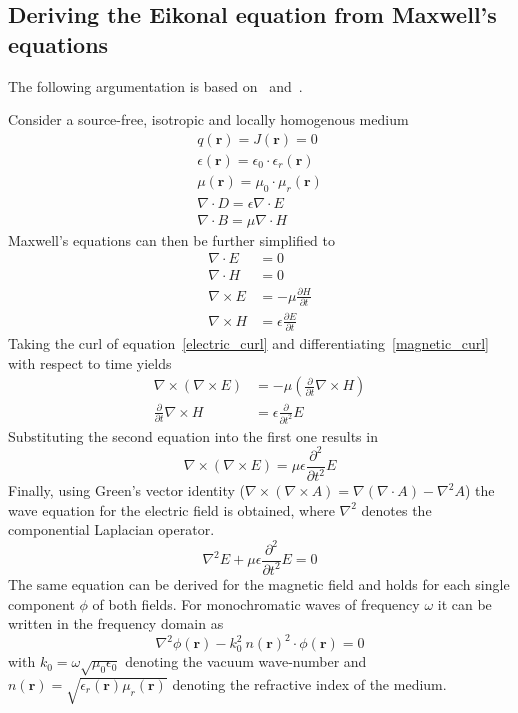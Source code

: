 \subsection{Deriving the Eikonal equation from Maxwell's equations}
The following argumentation is based on~\parencite{born_geometrische_1933} and~\parencite{sommerfeld_anwendung_1911}.

Consider a source-free, isotropic and locally homogenous medium
\begin{gather}
    q(\mathbf{r}) = J(\mathbf{r}) = 0 \\
    \epsilon(\mathbf{r}) = \epsilon_0 \cdot \epsilon_r(\mathbf{r}) \\
    \mu(\mathbf{r}) = \mu_0 \cdot \mu_r(\mathbf{r}) \\
    \nabla \cdot D = \epsilon \nabla \cdot E \\
    \nabla \cdot B = \mu \nabla \cdot H 
\end{gather}
Maxwell's equations can then be further simplified to
\begin{align}
    \nabla \cdot E &= 0 \\
    \nabla \cdot H &= 0 \\
    \nabla \times E &= -\mu \frac{\partial H}{\partial t}\label{electric_curl} \\
    \nabla \times H &= \epsilon \frac{\partial E}{\partial t}\label{magnetic_curl}
\end{align}
Taking the curl of equation~\eqref{electric_curl} and differentiating~\eqref{magnetic_curl} with respect to time yields
\begin{align}
    \nabla \times (\nabla \times E) &= -\mu (\frac{\partial}{\partial t} \nabla \times H) \\
    \frac{\partial}{\partial t} \nabla \times H &= \epsilon \frac{\partial}{\partial t^2} E
\end{align}
Substituting the second equation into the first one results in
\begin{equation}
    \nabla \times (\nabla \times E) = \mu \epsilon \frac{\partial^2}{\partial t^2} E
\end{equation}
Finally, using Green's vector identity (\(\nabla \times (\nabla \times A) = \nabla(\nabla \cdot A) - \nabla^2 A\)) the wave equation for the electric field is obtained, where \(\nabla^2\) denotes the componential Laplacian operator.
\begin{equation}
    \nabla^2 E + \mu \epsilon \frac{\partial^2}{\partial t^2} E = 0
\end{equation}
The same equation can be derived for the magnetic field and holds for each single component \(\phi \) of both fields.
For monochromatic waves of frequency \(\omega \) it can be written in the frequency domain as
\begin{equation}\label{electromagnetic_wave_equation}
    \nabla^2 \phi(\mathbf{r}) - k_0^2\ n{(\mathbf{r})}^2 \cdot \phi(\mathbf{r}) = 0
\end{equation}
with \(k_0 = \omega \sqrt{\mu_0 \epsilon_0} \) denoting the vacuum wave-number and \(n(\mathbf{r}) = \sqrt{\epsilon_r(\mathbf{r}) \mu_r(\mathbf{r})}\) denoting the refractive index of the medium.

